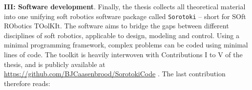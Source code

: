 \textbf{III: Software development}. Finally, the thesis collects all theoretical material into one unifying soft robotics software package called \texttt{Sorotoki} -- short for SOft RObotics TOolKIt. The software aims to bridge the gaps between different disciplines of soft robotics, applicable to design, modeling and control. Using a minimal programming framework, complex problems can be coded using minimal lines of code. The toolkit is heavily interwoven with Contributions I to V of the thesis, and is publicly available at \url{https://github.com/BJCaasenbrood/SorotokiCode} \cite{SorotokiCode}. The last contribution therefore reads: 

